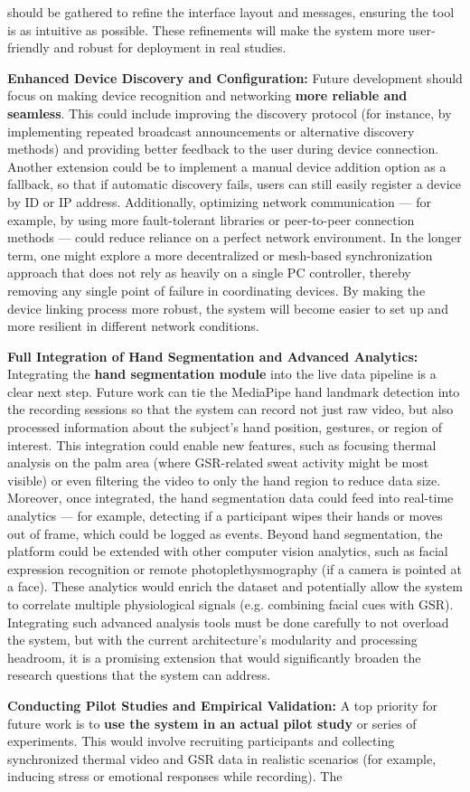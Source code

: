 should be gathered to refine the interface layout and messages, ensuring the tool is as intuitive as possible. These refinements will make the system more user-friendly and robust for deployment in real studies. \item \textbf{Enhanced Device Discovery and Configuration:} Future development should focus on making device recognition and networking \textbf{more reliable and seamless}. This could include improving the discovery protocol (for instance, by implementing repeated broadcast announcements or alternative discovery methods) and providing better feedback to the user during device connection. Another extension could be to implement a manual device addition option as a fallback, so that if automatic discovery fails, users can still easily register a device by ID or IP address. Additionally, optimizing network communication --- for example, by using more fault-tolerant libraries or peer-to-peer connection methods --- could reduce reliance on a perfect network environment. In the longer term, one might explore a more decentralized or mesh-based synchronization approach that does not rely as heavily on a single PC controller, thereby removing any single point of failure in coordinating devices. By making the device linking process more robust, the system will become easier to set up and more resilient in different network conditions. \item \textbf{Full Integration of Hand Segmentation and Advanced Analytics:} Integrating the \textbf{hand segmentation module} into the live data pipeline is a clear next step. Future work can tie the MediaPipe hand landmark detection into the recording sessions so that the system can record not just raw video, but also processed information about the subject's hand position, gestures, or region of interest. This integration could enable new features, such as focusing thermal analysis on the palm area (where GSR-related sweat activity might be most visible) or even filtering the video to only the hand region to reduce data size. Moreover, once integrated, the hand segmentation data could feed into real-time analytics --- for example, detecting if a participant wipes their hands or moves out of frame, which could be logged as events. Beyond hand segmentation, the platform could be extended with other computer vision analytics, such as facial expression recognition or remote photoplethysmography (if a camera is pointed at a face). These analytics would enrich the dataset and potentially allow the system to correlate multiple physiological signals (e.g. combining facial cues with GSR). Integrating such advanced analysis tools must be done carefully to not overload the system, but with the current architecture's modularity and processing headroom, it is a promising extension that would significantly broaden the research questions that the system can address. \item \textbf{Conducting Pilot Studies and Empirical Validation:} A top priority for future work is to \textbf{use the system in an actual pilot study} or series of experiments. This would involve recruiting participants and collecting synchronized thermal video and GSR data in realistic scenarios (for example, inducing stress or emotional responses while recording). The 